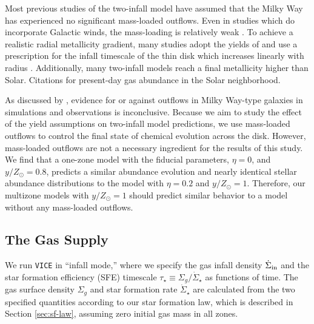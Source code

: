 \documentclass[twocolumn,twocolappendix,linenumbers]{aastex631}
\newcommand{\todo}[1]{{\color{red}#1}}
\newcommand{\yZ}[1]{$y/Z_\odot=#1$}
\begin{document}
Most previous studies of the two-infall model have assumed that the Milky Way has experienced no significant mass-loaded outflows. Even in studies which do incorporate Galactic winds, the mass-loading is relatively weak \citep[e.g., $\eta\approx0.2$ in][]{palicio_analytic_2023}. To achieve a realistic radial metallicity gradient, many studies adopt the yields of \citet{francois_evolution_2004} and use a prescription for the infall timescale of the thin disk which increases linearly with radius \citep[e.g.,][]{chiappini_chemical_1997,romano_mass_2000}. \todo{Additionally, many two-infall models reach a final metallicity higher than Solar. Citations for present-day gas abundance in the Solar neighborhood.}

As discussed by \citet{johnson_milky_2024}, evidence for or against outflows in Milky Way-type galaxies in simulations and observations is inconclusive. Because we aim to study the effect of the yield assumptions on two-infall model predictions, we use mass-loaded outflows to control the final state of chemical evolution across the disk. However, mass-loaded outflows are not a necessary ingredient for the results of this study. We find that a one-zone model with the fiducial parameters, $\eta=0$, and \yZ{0.8}, predicts a similar abundance evolution and nearly identical stellar abundance distributions to the model with $\eta=0.2$ and \yZ{1}. Therefore, our multizone models with \yZ{1} should predict similar behavior to a model without any mass-loaded outflows. %

\subsection{The Gas Supply}
\label{sec:sfh}

We run {\tt VICE} in ``infall mode,'' where we specify the gas infall density $\dot\Sigma_{\rm in}$ and the star formation efficiency (SFE) timescale $\tau_\star\equiv \Sigma_g / \dot\Sigma_\star$ as functions of time. The gas surface density $\Sigma_g$ and star formation rate $\dot\Sigma_\star$ are calculated from the two specified quantities according to our star formation law, which is described in Section \ref{sec:sf-law}, assuming zero initial gas mass in all zones.
\end{document}
